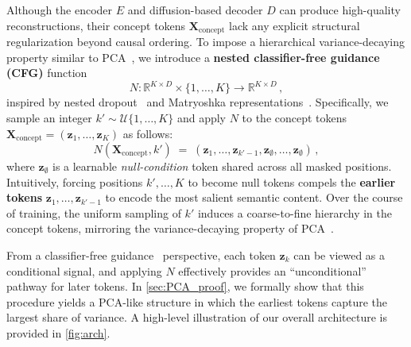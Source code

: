 \documentclass[10pt,twocolumn,letterpaper]{article}
\begin{document}
Although the encoder \(E\) and diffusion-based decoder \(D\) can produce high-quality reconstructions, their concept tokens \(\bm{X}_{\text{concept}}\) lack any explicit structural regularization beyond causal ordering. 
To impose a hierarchical variance-decaying property similar to PCA~\cite{shlens2014tutorial}, we introduce a \textbf{nested classifier-free guidance (CFG)} function  
\begin{equation}
N:\mathbb{R}^{K \times D} \times \{1, \dots, K\} \to \mathbb{R}^{K \times D} \,, \nonumber
\end{equation}
inspired by nested dropout~\cite{nested_dropout,iob} and Matryoshka representations~\cite{kusupati2022matryoshka}.
Specifically, we sample an integer \(k' \sim \mathcal{U}\{1, \dots, K\}\) and apply \(N\) to the concept tokens \(\bm{X}_{\text{concept}} = (\bm{z}_1,\dots,\bm{z}_K)\) as follows:  
\[
N(\bm{X}_{\text{concept}}, k') \;=\; (\bm{z}_1,\dots,\bm{z}_{k'-1}, \bm{z}_{\emptyset}, \dots, \bm{z}_{\emptyset}) \,,
\]  
where \(\bm{z}_{\emptyset}\) is a learnable \textit{null-condition} token shared across all masked positions. 
Intuitively, forcing positions \(k', \dots, K\) to become null tokens compels the \textbf{earlier tokens} \(\bm{z}_1,\dots,\bm{z}_{k'-1}\) to encode the most salient semantic content. 
Over the course of training, the uniform sampling of \(k'\) induces a coarse-to-fine hierarchy in the concept tokens, mirroring the variance-decaying property of PCA~\cite{shlens2014tutorial}.  

From a classifier-free guidance~\cite{cfg} perspective, each token \(\bm{z}_k\) can be viewed as a conditional signal, and applying \(N\) effectively provides an “unconditional” pathway for later tokens. 
In \cref{sec:PCA_proof}, we formally show that this procedure yields a PCA-like structure in which the earliest tokens capture the largest share of variance. A high-level illustration of our overall architecture is provided in \cref{fig:arch}.
\end{document}
